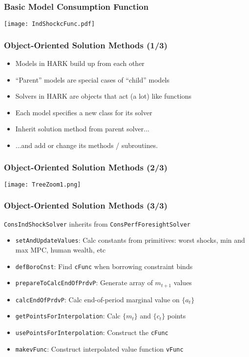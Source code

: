 \documentclass[11pt,handout]{beamer}
\begin{document}
\begin{frame}
\frametitle{Basic Model Consumption Function}
\begin{center}
\texttt{[image: IndShockcFunc.pdf]}
\end{center}
\end{frame}


\begin{frame}
\frametitle{Object-Oriented Solution Methods (1/3)}
\begin{itemize}
\item <1->Models in HARK build up from each other

\item <1->``Parent'' models are special cases of ``child'' models

\item <2->Solvers in HARK are objects that act (a lot) like functions

\item <2->Each model specifies a new class for its solver

\item <2->Inherit solution method from parent solver...

\item <2->...and add or change its methods / subroutines.
\end{itemize}
\end{frame}


\begin{frame}
\frametitle{Object-Oriented Solution Methods (2/3)}
\begin{center}
\texttt{[image: TreeZoom1.png]}
\end{center}
\end{frame}


\begin{frame}
\frametitle{Object-Oriented Solution Methods (3/3)}
\texttt{ConsIndShockSolver} inherits from \texttt{ConsPerfForesightSolver}
\begin{itemize}
\item <1->\texttt{setAndUpdateValues}: Calc constants from primitives: worst shocks, min and max MPC, human wealth, etc

\item <1->\texttt{defBoroCnst}: Find \texttt{cFunc} when borrowing constraint binds

\item <2->\texttt{prepareToCalcEndOfPrdvP}: Generate array of $m_{t+1}$ values

\item <2->\texttt{calcEndOfPrdvP}: Calc end-of-period marginal value on $\{a_t\}$

\item <3->\texttt{getPointsForInterpolation}: Calc $\{m_t\}$ and $\{c_t\}$ points

\item <3->\texttt{usePointsForInterpolation}: Construct the \texttt{cFunc}

\item <3->\texttt{makevFunc}: Construct interpolated value function \texttt{vFunc}
\end{itemize}
\end{frame}
\end{document}
